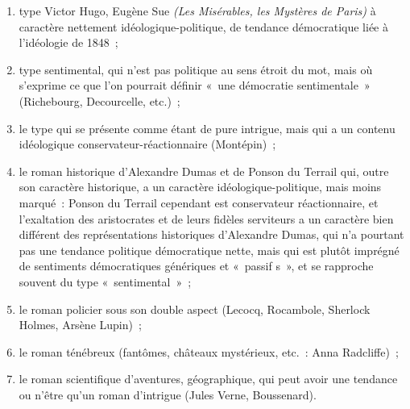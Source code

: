 \documentclass[french,twoside]{book} %
\begin{document}
\begin{enumerate}[itemsep=0pt,]
\item type Victor Hugo, Eugène Sue \emph{(Les Misérables, les Mystères de Paris)} à caractère nettement idéologique-politique, de tendance démocratique liée à l’idéologie de 1848 ; 
\item type sentimental, qui n’est pas politique au sens étroit du mot, mais où s’exprime ce que l’on pourrait définir « une démocratie sentimentale » (Richebourg, Decourcelle, etc.) ; 
\item le type qui se présente comme étant de pure intrigue, mais qui a un contenu idéologique conservateur-réactionnaire (Montépin) ; 
\item le roman historique d’Alexandre Dumas et de Ponson du Terrail qui, outre son caractère historique, a un caractère idéologique-politique, mais moins marqué : Ponson du Terrail cependant est conservateur réactionnaire, et l’exaltation des aristocrates et de leurs fidèles serviteurs a un caractère bien différent des représentations historiques d’Alexandre Dumas, qui n’a pourtant pas une tendance politique démocratique nette, mais qui est plutôt imprégné de sentiments démocratiques génériques et « passif s », et se rapproche souvent du type « sentimental » ;
\item le roman policier sous son double aspect (Lecocq, Rocambole, Sherlock Holmes, Arsène Lupin) ;
\item le roman ténébreux (fantômes, châteaux mystérieux, etc. : Anna Radcliffe) ;
\item le roman scientifique d’aventures, géographique, qui peut avoir une tendance ou n’être qu’un roman d’intrigue (Jules Verne, Boussenard).
\end{enumerate}
\end{document}
